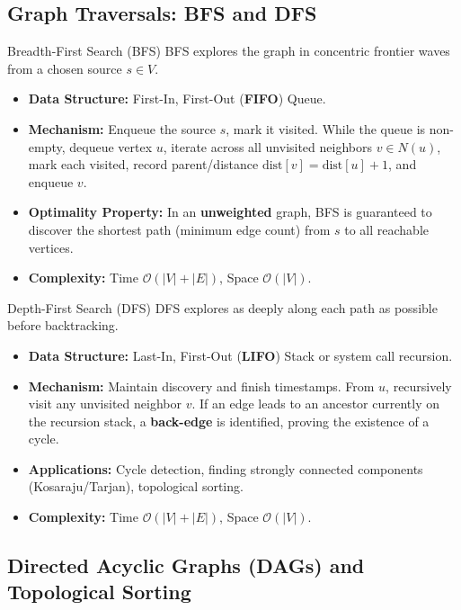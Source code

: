 \subsection{Graph Traversals: BFS and DFS}

\begin{definitionbox}{Breadth-First Search (BFS)}
BFS explores the graph in concentric frontier waves from a chosen source $s \in V$.
\begin{itemize}
    \item \textbf{Data Structure:} First-In, First-Out (\textbf{FIFO}) Queue.
    \item \textbf{Mechanism:} Enqueue the source $s$, mark it visited. While the queue is non-empty, dequeue vertex $u$, iterate across all unvisited neighbors $v \in N(u)$, mark each visited, record parent/distance $\text{dist}[v] = \text{dist}[u] + 1$, and enqueue $v$.
    \item \textbf{Optimality Property:} In an \textbf{unweighted} graph, BFS is guaranteed to discover the shortest path (minimum edge count) from $s$ to all reachable vertices.
    \item \textbf{Complexity:} Time $\mathcal{O}(|V| + |E|)$, Space $\mathcal{O}(|V|)$.
\end{itemize}
\end{definitionbox}

\begin{definitionbox}{Depth-First Search (DFS)}
DFS explores as deeply along each path as possible before backtracking.
\begin{itemize}
    \item \textbf{Data Structure:} Last-In, First-Out (\textbf{LIFO}) Stack or system call recursion.
    \item \textbf{Mechanism:} Maintain discovery and finish timestamps. From $u$, recursively visit any unvisited neighbor $v$. If an edge leads to an ancestor currently on the recursion stack, a \textbf{back-edge} is identified, proving the existence of a cycle.
    \item \textbf{Applications:} Cycle detection, finding strongly connected components (Kosaraju/Tarjan), topological sorting.
    \item \textbf{Complexity:} Time $\mathcal{O}(|V| + |E|)$, Space $\mathcal{O}(|V|)$.
\end{itemize}
\end{definitionbox}

\subsection{Directed Acyclic Graphs (DAGs) and Topological Sorting}

